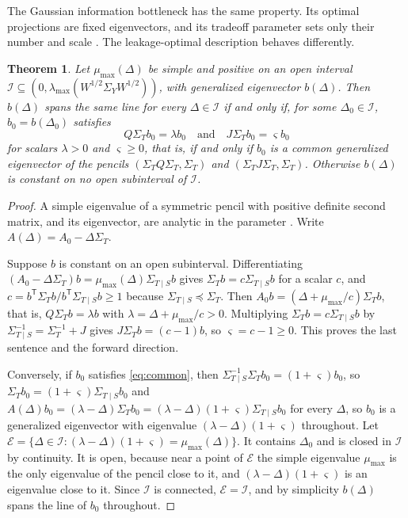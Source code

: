 \documentclass[11pt,onecolumn]{IEEEtran}
\newtheorem{theorem}{Theorem}
\newcommand{\Kc}{\Sigma_{T\mid S}}
\begin{document}
The Gaussian information bottleneck has the same property. Its optimal
projections are fixed eigenvectors, and its tradeoff parameter sets only
their number and scale \cite{chechik2005}. The leakage-optimal
description behaves differently.

\begin{theorem}\label{thm:turning}
Let $\mu_{\max}(\Delta)$ be simple and positive on an open interval
$\mathcal I\subseteq(0,\lambda_{\max}(W^{1/2}\Sigma_YW^{1/2}))$, with
generalized eigenvector $b(\Delta)$. Then $b(\Delta)$ spans the same line
for every $\Delta\in\mathcal I$ if and only if, for some
$\Delta_0\in\mathcal I$, $b_0=b(\Delta_0)$ satisfies
\begin{equation}
Q\Sigma_Tb_0=\lambda b_0
\quad\text{and}\quad
J\Sigma_Tb_0=\varsigma b_0
\label{eq:common}
\end{equation}
for scalars $\lambda>0$ and $\varsigma\ge0$, that is, if and only if $b_0$
is a common generalized eigenvector of the pencils
$(\Sigma_TQ\Sigma_T,\Sigma_T)$ and $(\Sigma_TJ\Sigma_T,\Sigma_T)$.
Otherwise $b(\Delta)$ is constant on no open subinterval of $\mathcal I$.
\end{theorem}

\begin{proof}
A simple eigenvalue of a symmetric pencil with positive definite second
matrix, and its eigenvector, are analytic in the parameter
\cite{kato1995}. Write $A(\Delta)=A_0-\Delta\Sigma_T$.

Suppose $b$ is constant on an open subinterval. Differentiating
$(A_0-\Delta\Sigma_T)b=\mu_{\max}(\Delta)\Kc b$ gives
$\Sigma_Tb=c\Kc b$ for a scalar $c$, and
$c=b^{\mathsf T}\Sigma_Tb/b^{\mathsf T}\Kc b\ge1$ because
$\Kc\preceq\Sigma_T$. Then $A_0b=(\Delta+\mu_{\max}/c)\Sigma_Tb$, that is,
$Q\Sigma_Tb=\lambda b$ with $\lambda=\Delta+\mu_{\max}/c>0$.
Multiplying $\Sigma_Tb=c\Kc b$ by $\Kc^{-1}=\Sigma_T^{-1}+J$ gives
$J\Sigma_Tb=(c-1)b$, so $\varsigma=c-1\ge0$. This proves the last sentence
and the forward direction.

Conversely, if $b_0$ satisfies \eqref{eq:common}, then
$\Kc^{-1}\Sigma_Tb_0=(1+\varsigma)b_0$, so $\Sigma_Tb_0=(1+\varsigma)\Kc b_0$ and
$A(\Delta)b_0=(\lambda-\Delta)\Sigma_Tb_0=(\lambda-\Delta)(1+\varsigma)\Kc b_0$
for every $\Delta$, so $b_0$ is a generalized eigenvector with eigenvalue
$(\lambda-\Delta)(1+\varsigma)$ throughout. Let
$\mathcal E=\{\Delta\in\mathcal I:(\lambda-\Delta)(1+\varsigma)=\mu_{\max}(\Delta)\}$.
It contains $\Delta_0$ and is closed in $\mathcal I$ by continuity. It is
open, because near a point of $\mathcal E$ the simple eigenvalue
$\mu_{\max}$ is the only eigenvalue of the pencil close to it, and
$(\lambda-\Delta)(1+\varsigma)$ is an eigenvalue close to it. Since
$\mathcal I$ is connected, $\mathcal E=\mathcal I$, and by simplicity
$b(\Delta)$ spans the line of $b_0$ throughout.
\end{proof}
\end{document}

